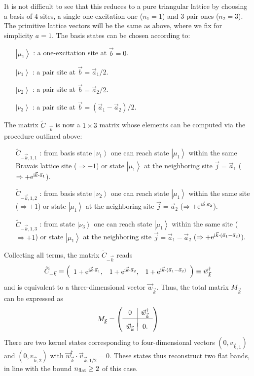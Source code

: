 \documentclass[prl,aps,twocolumn,showpacs,superscriptaddress,longbibliography]{revtex4-1}
\newcommand{\be}{\begin{equation}}
\newcommand{\ee}{\end{equation}}
\newcommand{\matb}{\left(\begin{array}}
\newcommand{\mate}{\end{array}\right)}
\newcommand{\rmi}{{\rm{i}}}
\newcommand{\rme}[1]{{\rm{e}}^{#1}}
\newcommand{\wt}{\widetilde}
\newcommand{\ran}{\right\rangle}
\newcommand{\ket}[1]{\left| #1 \ran}
\begin{document}
It is not difficult to see that this reduces to a pure triangular lattice by choosing a basis of $4$ sites, a single one-excitation one ($n_1 = 1$) and $3$ pair ones ($n_2 = 3$). The primitive lattice vectors will be the same as above, where we fix for simplicity $a=1$. The basis states can be chosen according to:
\begin{itemize}
	\item[$\ket{\mu_1}$]: a one-excitation site at $\vec{b} = 0$.
	\item[$\ket{\nu_1}$]: a pair site at $\vec{b} = \vec{a}_1 / 2$.
	\item[$\ket{\nu_2}$]: a pair site at $\vec{b} = \vec{a}_2 / 2$.
	\item[$\ket{\nu_3}$]: a pair site at $\vec{b} = (\vec{a}_1 - \vec{a}_2) / 2$.
\end{itemize}
The matrix $\wt{C}_{-\vec{k}}$ is now a $1 \times 3$ matrix whose elements can be computed via the procedure outlined above:
\begin{itemize}
	\item[$\wt{C}_{-\vec{k},1,1}$]: from basis state $\ket{\nu_1}$ one can reach state $\ket{\mu_1}$ within the same Bravais lattice site ($\Rightarrow +1$) or state $\ket{\mu_1}$ at the neighboring site $\vec{j} = \vec{a}_1$ ($\Rightarrow +\rme{\rmi\vec{k} \cdot \vec{a}_1}$).
	\item[$\wt{C}_{-\vec{k},1,2}$]: from basis state $\ket{\nu_2}$ one can reach state $\ket{\mu_1}$ within the same site ($\Rightarrow +1$) or state $\ket{\mu_1}$ at the neighboring site $\vec{j} = \vec{a}_2$ ($\Rightarrow +\rme{\rmi\vec{k} \cdot \vec{a}_2}$).
	\item[$\wt{C}_{-\vec{k},1,3}$]: from state $\ket{\nu_3}$ one can reach state $\ket{\mu_1}$ within the same site ($\Rightarrow +1$) or state $\ket{\mu_1}$ at the neighboring site $\vec{j} = \vec{a}_1 - \vec{a}_2$ ($\Rightarrow +\rme{\rmi\vec{k} \cdot (\vec{a}_1 - \vec{a}_2)}$).
\end{itemize}
Collecting all terms, the matrix $\wt{C}_{-\vec{k}}$ reads
\be
	\wt{C}_{-\vec{k}} = \matb{ccc} 1 + \rme{\rmi\vec{k} \cdot \vec{a}_1}, &   1 + \rme{\rmi\vec{k} \cdot \vec{a}_2} , &  1 + \rme{\rmi\vec{k} \cdot( \vec{a}_1 - \vec{a}_2)}   \mate \equiv \vec{w}_{\vec{k}}^\dag
\ee
and is equivalent to a three-dimensional vector $\vec{w}_{\vec{k}}$. Thus, the total matrix $M_{\vec{k}}$ can be expressed as 
\be
	M_{\vec{k}} = \matb{c|c} 0 & \vec{w}_{\vec{k}}^\dag  \\ \hline \\[-2mm] \vec{w}_{\vec{k}} & 0.    \mate  
\ee
There are two kernel states corresponding to four-dimensional vectors $(0,v_{\vec{k},1})$ and $(0,v_{\vec{k},2})$ with $\vec{w}^\dag_{\vec{k}} \cdot \vec{v}_{\vec{k},1/2} = 0$. These states thus reconstruct two flat bands, in line with the bound $n_{\rm flat} \geq 2$ of this case.
 
\end{document}
